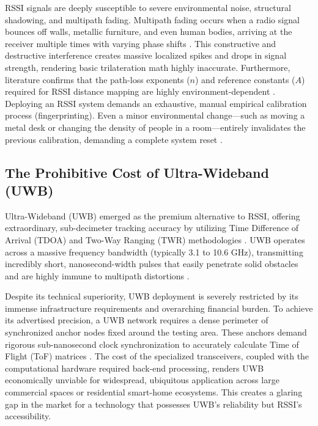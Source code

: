 RSSI signals are deeply susceptible to severe environmental noise, structural shadowing, and multipath fading. Multipath fading occurs when a radio signal bounces off walls, metallic furniture, and even human bodies, arriving at the receiver multiple times with varying phase shifts \cite{pahlavan2002indoor}. This constructive and destructive interference creates massive localized spikes and drops in signal strength, rendering basic trilateration math highly inaccurate. Furthermore, literature confirms that the path-loss exponents ($n$) and reference constants ($A$) required for RSSI distance mapping are highly environment-dependent \cite{seidel1992path}. Deploying an RSSI system demands an exhaustive, manual empirical calibration process (fingerprinting). Even a minor environmental change—such as moving a metal desk or changing the density of people in a room—entirely invalidates the previous calibration, demanding a complete system reset \cite{yassin2017recent}.

\subsection{The Prohibitive Cost of Ultra-Wideband (UWB)}

Ultra-Wideband (UWB) emerged as the premium alternative to RSSI, offering extraordinary, sub-decimeter tracking accuracy by utilizing Time Difference of Arrival (TDOA) and Two-Way Ranging (TWR) methodologies \cite{alavi2017indoor}. UWB operates across a massive frequency bandwidth (typically 3.1 to 10.6 GHz), transmitting incredibly short, nanosecond-width pulses that easily penetrate solid obstacles and are highly immune to multipath distortions \cite{dardari2009ranging}.

Despite its technical superiority, UWB deployment is severely restricted by its immense infrastructure requirements and overarching financial burden. To achieve its advertised precision, a UWB network requires a dense perimeter of synchronized anchor nodes fixed around the testing area. These anchors demand rigorous sub-nanosecond clock synchronization to accurately calculate Time of Flight (ToF) matrices \cite{gezici2005localization}. The cost of the specialized transceivers, coupled with the computational hardware required back-end processing, renders UWB economically unviable for widespread, ubiquitous application across large commercial spaces or residential smart-home ecosystems. This creates a glaring gap in the market for a technology that possesses UWB's reliability but RSSI's accessibility.

